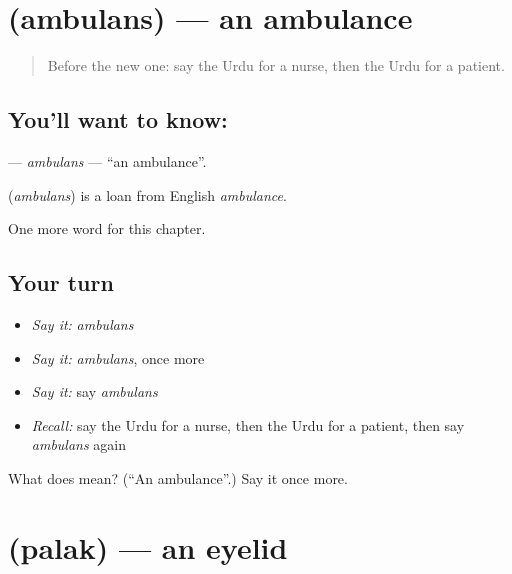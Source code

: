 \section[\texorpdfstring{\ur{ایمبولینس} (ambulans)}{ایمبولینس (ambulans)}]{ (ambulans) — an ambulance}

\label{lesson:UR-C153-ambulans}



\begin{quote}
Before the new one: say the Urdu for a nurse, then the Urdu for a patient.
\end{quote}

\subsection*{You'll want to know: }
\textbf{} — \emph{ambulans} — \textquotedblleft{}an ambulance\textquotedblright{}.

\begin{cousinweb}
\textbf{} (\emph{ambulans}) is a loan from English \emph{ambulance}.
\end{cousinweb}

\begin{grammarlens}[title={What you've built}]
One more word for this chapter.
\end{grammarlens}

\subsection*{Your turn}
\begin{itemize}
\raggedright
  \item \emph{Say it:} \emph{ambulans}
  \item \emph{Say it:} \emph{ambulans}, once more
  \item \emph{Say it:} say \emph{ambulans}
  \item \emph{Recall:} say the Urdu for a nurse, then the Urdu for a patient, then say \emph{ambulans} again
\end{itemize}

\begin{tcolorbox}[breakable,colback=teal!4,colframe=teal!35!black,title={Before you move on}]
What does  mean? (\textquotedblleft{}An ambulance\textquotedblright{}.) Say it once more.
\end{tcolorbox}
\section[\texorpdfstring{\ur{پلک} (palak)}{پلک (palak)}]{ (palak) — an eyelid}

